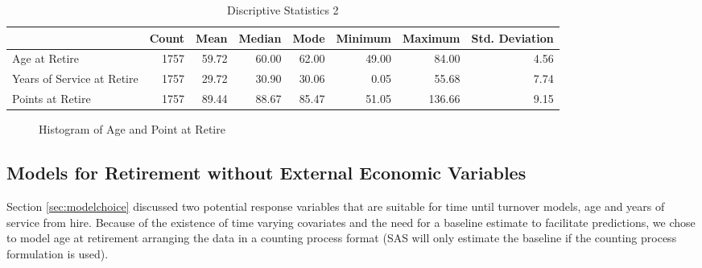 \documentclass[12pt,letterpaper]{article}
\begin{document}
\begin{table}[htbp]
	\centering
	\scriptsize
	\caption{Discriptive Statistics 2}
	\begin{tabular}{lrrrrrrr}
		\toprule
		& Count & Mean  & Median & Mode  & Minimum & Maximum & Std. Deviation \\
		\midrule
		\multicolumn{1}{l}{Age at Retire} & 1757  & 59.72 & 60.00 & 62.00 & 49.00 & 84.00 & 4.56 \\
		\multicolumn{1}{l}{Years of Service at Retire} & 1757  & 29.72 & 30.90 & 30.06 & 0.05  & 55.68 & 7.74 \\
		\multicolumn{1}{l}{Points at Retire} & 1757  & 89.44 & 88.67 & 85.47 & 51.05 & 136.66 & 9.15 \\
		\bottomrule
	\end{tabular}%
	\label{tab:descrip2}%
\end{table}%

\begin{figure}[h!]
	\centering
	\caption{Histogram of Age and Point at Retire}
	\label{fig:hist}
\end{figure}



\subsection{Models for Retirement without External Economic Variables}
Section \ref{sec:modelchoice} discussed two potential response variables that are suitable for time until turnover models, age and years of service from hire.  Because of the existence of time varying covariates and the need for a baseline estimate to facilitate predictions, we chose to model age at retirement arranging the data in a counting process format (SAS will only estimate the baseline if the counting process formulation is used).
\end{document}
